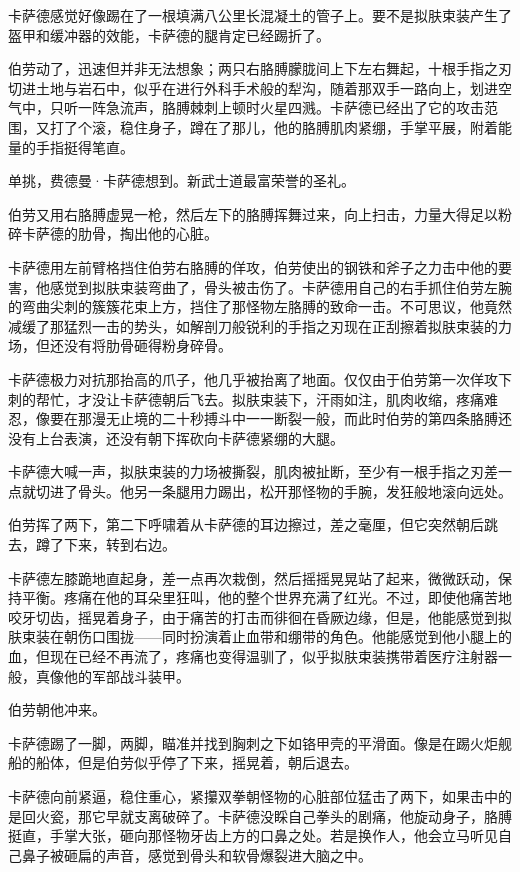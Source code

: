 \documentclass[AutoFakeBold=true]{book}
\begin{document}
卡萨德感觉好像踢在了一根填满八公里长混凝土的管子上。要不是拟肤束装产生了盔甲和缓冲器的效能，卡萨德的腿肯定已经踢折了。

伯劳动了，迅速但并非无法想象；两只右胳膊朦胧间上下左右舞起，十根手指之刃切进土地与岩石中，似乎在进行外科手术般的犁沟，随着那双手一路向上，划进空气中，只听一阵急流声，胳膊棘刺上顿时火星四溅。卡萨德已经出了它的攻击范围，又打了个滚，稳住身子，蹲在了那儿，他的胳膊肌肉紧绷，手掌平展，附着能量的手指挺得笔直。

{\kaishu 单挑，}费德曼·卡萨德想到。{\kaishu 新武士道最富荣誉的圣礼。}

伯劳又用右胳膊虚晃一枪，然后左下的胳膊挥舞过来，向上扫击，力量大得足以粉碎卡萨德的肋骨，掏出他的心脏。

卡萨德用左前臂格挡住伯劳右胳膊的佯攻，伯劳使出的钢铁和斧子之力击中他的要害，他感觉到拟肤束装弯曲了，骨头被击伤了。卡萨德用自己的右手抓住伯劳左腕的弯曲尖刺的簇簇花束上方，挡住了那怪物左胳膊的致命一击。不可思议，他竟然减缓了那猛烈一击的势头，如解剖刀般锐利的手指之刃现在正刮擦着拟肤束装的力场，但还没有将肋骨砸得粉身碎骨。

卡萨德极力对抗那抬高的爪子，他几乎被抬离了地面。仅仅由于伯劳第一次佯攻下刺的帮忙，才没让卡萨德朝后飞去。拟肤束装下，汗雨如注，肌肉收缩，疼痛难忍，像要在那漫无止境的二十秒搏斗中一一断裂一般，而此时伯劳的第四条胳膊还没有上台表演，还没有朝下挥砍向卡萨德紧绷的大腿。

卡萨德大喊一声，拟肤束装的力场被撕裂，肌肉被扯断，至少有一根手指之刃差一点就切进了骨头。他另一条腿用力踢出，松开那怪物的手腕，发狂般地滚向远处。

伯劳挥了两下，第二下呼啸着从卡萨德的耳边擦过，差之毫厘，但它突然朝后跳去，蹲了下来，转到右边。

卡萨德左膝跪地直起身，差一点再次栽倒，然后摇摇晃晃站了起来，微微跃动，保持平衡。疼痛在他的耳朵里狂叫，他的整个世界充满了红光。不过，即使他痛苦地咬牙切齿，摇晃着身子，由于痛苦的打击而徘徊在昏厥边缘，但是，他能感觉到拟肤束装在朝伤口围拢——同时扮演着止血带和绷带的角色。他能感觉到他小腿上的血，但现在已经不再流了，疼痛也变得温驯了，似乎拟肤束装携带着医疗注射器一般，真像他的军部战斗装甲。

伯劳朝他冲来。

卡萨德踢了一脚，两脚，瞄准并找到胸刺之下如铬甲壳的平滑面。像是在踢火炬舰船的船体，但是伯劳似乎停了下来，摇晃着，朝后退去。

卡萨德向前紧逼，稳住重心，紧攥双拳朝怪物的心脏部位猛击了两下，如果击中的是回火瓷，那它早就支离破碎了。卡萨德没睬自己拳头的剧痛，他旋动身子，胳膊挺直，手掌大张，砸向那怪物牙齿上方的口鼻之处。若是换作人，他会立马听见自己鼻子被砸扁的声音，感觉到骨头和软骨爆裂进大脑之中。
\end{document}
